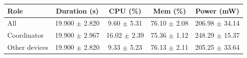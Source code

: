 \begin{tabular}{lcccc}
\hline
\textbf{Role} & \textbf{Duration (s)} & \textbf{CPU (\%)} & \textbf{Mem (\%)} & \textbf{Power (mW)} \\
\hline
All & 19.900 $\pm$ 2.820 & 9.60 $\pm$ 5.31 & 76.10 $\pm$ 2.08 & 206.98 $\pm$ 34.14 \\
Coordinator & 19.900 $\pm$ 2.967 & 16.02 $\pm$ 2.39 & 75.36 $\pm$ 1.12 & 248.29 $\pm$ 15.37 \\
Other devices & 19.900 $\pm$ 2.820 & 9.33 $\pm$ 5.23 & 76.13 $\pm$ 2.11 & 205.25 $\pm$ 33.64 \\
\hline
\end{tabular}
